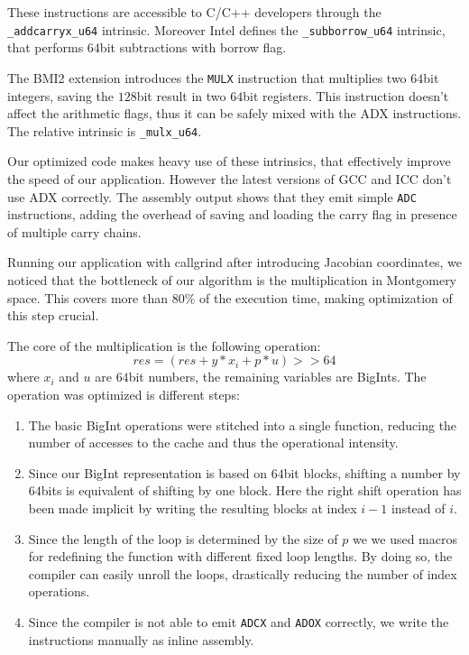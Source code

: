 These instructions are accessible to C/C++ developers through the \texttt{\_addcarryx\_u64} intrinsic. Moreover Intel defines the \texttt{\_subborrow\_u64} intrinsic, that performs $64$bit subtractions with borrow flag.

The BMI2 extension introduces the \texttt{MULX} instruction that multiplies two $64$bit integers, saving the $128$bit result in two $64$bit registers. This instruction doesn't affect the arithmetic flags, thus it can be safely mixed with the ADX instructions. The relative intrinsic is \texttt{\_mulx\_u64}. 

Our optimized code makes heavy use of these intrinsics, that effectively improve the speed of our application. However the latest versions of GCC and ICC don't use ADX correctly. The assembly output shows that they emit simple \texttt{ADC} instructions, adding the overhead of saving and loading the carry flag in presence of multiple carry chains.

Running our application with callgrind after introducing Jacobian coordinates, we noticed that the bottleneck of our algorithm is the multiplication in Montgomery space. This covers more than $80\%$ of the execution time, making optimization of this step crucial.
 
The core of the multiplication is the following operation:
$$res = \left(res + y * x_i + p * u\right) >> 64$$
where $x_i$ and $u$ are $64$bit numbers, the remaining variables are BigInts. The operation was optimized is different steps:
\begin{enumerate}
\item The basic BigInt operations were stitched into a single function, reducing the number of accesses to the cache and thus the operational intensity.
\item Since our BigInt representation is based on $64$bit blocks, shifting a number by $64$bits is equivalent of shifting by one block. Here the right shift operation has been made implicit by writing the resulting blocks at index $i-1$ instead of $i$.
\item Since the length of the loop is determined by the size of $p$ we we used macros for redefining the function with different fixed loop lengths. By doing so, the compiler can easily unroll the loops, drastically reducing the number of index operations. 
\item Since the compiler is not able to emit \texttt{ADCX} and \texttt{ADOX} correctly, we write the instructions manually as inline assembly.
\end{enumerate}

